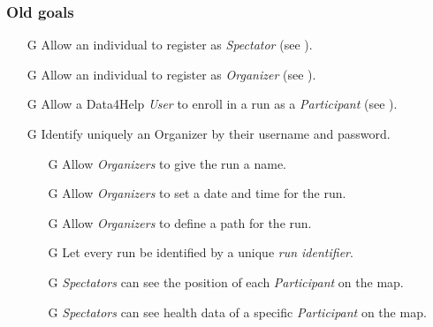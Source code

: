 \documentclass[../../rasd.tex]{subfiles}
\begin{document}
					\subsubsection{Old goals}
					\begin{itemize}
						\item[G\subs{15}]Allow an individual to register as \textit{Spectator} (see ).
						\item[G\subs{16}]Allow an individual to register as \textit{Organizer} (see ).
						\item[G\subs{17}]Allow a Data4Help \textit{User} to enroll in a run as a \textit{Participant} (see ).
						\item[G\subs{18}]Identify uniquely an Organizer by their username and password.

						\begin{itemize}
							\item[G\subs{19.1}]Allow \textit{Organizers} to give the run a name.
							\item[G\subs{19.2}]Allow \textit{Organizers} to set a date and time for the run.
							\item[G\subs{19.3}]Allow \textit{Organizers} to define a path for the run.
							\item[G\subs{19.4}]Let every run be identified by a unique \textit{run identifier}.
						\end{itemize}

						\begin{itemize}
							\item[G\subs{20.1}]\textit{Spectators} can see the position of each \textit{Participant} on the map.
							\item[G\subs{20.2}]\textit{Spectators} can see health data of a specific \textit{Participant} on the map.
							\end{itemize}
					\end{itemize}

			
			
\end{document}
